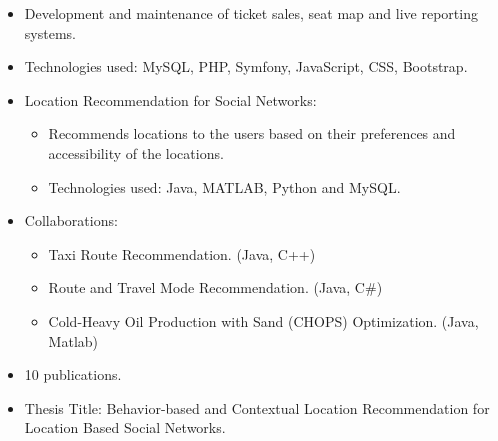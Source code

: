 \documentclass[10pt,a4paper,ragged2e,withhyper]{altacv}
\begin{document}
\begin{paracol}{2}
            \begin{itemize}
                \item Development and maintenance of ticket sales, seat map and live reporting systems.
                \item
                Technologies used: MySQL, PHP, Symfony, JavaScript, CSS, Bootstrap.
            \end{itemize}
            \divider
            
            \begin{itemize}
                \item Location Recommendation for Social Networks:
                \begin{itemize}
                    \item Recommends locations to the users based on their preferences and accessibility of the locations.
                    \item Technologies used:  Java, MATLAB, Python and MySQL.
                \end{itemize}
                \item Collaborations:
                \begin{itemize}
                    \item Taxi Route Recommendation. (Java, C++)
                    \item Route and Travel Mode Recommendation. (Java, C\#)
                    \item Cold-Heavy Oil Production with Sand (CHOPS) Optimization. (Java, Matlab)
                \end{itemize}
                \item 10 publications.
            \end{itemize}
        
            \begin{itemize}
                 \item Thesis Title: Behavior-based and Contextual Location Recommendation for Location Based Social Networks.
            \end{itemize}
            \divider
            

\end{paracol}
\end{document}
